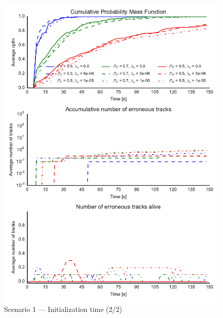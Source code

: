 \begin{figure}
\centering
\includegraphics{Figures/plots/Scenario1_Init-Time(2-2).pdf}
\caption{Scenario 1 --- Initialization time (2/2)}\label{fig:init1_time_2-2}
\end{figure}

